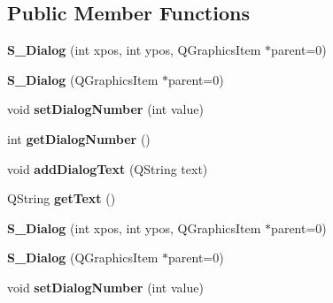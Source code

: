 \subsection*{Public Member Functions}
\begin{DoxyCompactItemize}
\item 
\hypertarget{class_s___dialog_a9b20a59ab0954ef8d9befdfbb556e398}{}{\bfseries S\+\_\+\+Dialog} (int xpos, int ypos, Q\+Graphics\+Item $\ast$parent=0)\label{class_s___dialog_a9b20a59ab0954ef8d9befdfbb556e398}

\item 
\hypertarget{class_s___dialog_a1694750fe7501bc3cd20eb97e1e3384f}{}{\bfseries S\+\_\+\+Dialog} (Q\+Graphics\+Item $\ast$parent=0)\label{class_s___dialog_a1694750fe7501bc3cd20eb97e1e3384f}

\item 
\hypertarget{class_s___dialog_a139b0eb3a98042192ac78df37806f1ad}{}void {\bfseries set\+Dialog\+Number} (int value)\label{class_s___dialog_a139b0eb3a98042192ac78df37806f1ad}

\item 
\hypertarget{class_s___dialog_ad26a628ae1d62d07e1b226126b04814f}{}int {\bfseries get\+Dialog\+Number} ()\label{class_s___dialog_ad26a628ae1d62d07e1b226126b04814f}

\item 
\hypertarget{class_s___dialog_ac156dc3bb16b5c84bce3c710dae215f7}{}void {\bfseries add\+Dialog\+Text} (Q\+String text)\label{class_s___dialog_ac156dc3bb16b5c84bce3c710dae215f7}

\item 
\hypertarget{class_s___dialog_aac6c0556054892ff474f485b962027fd}{}Q\+String {\bfseries get\+Text} ()\label{class_s___dialog_aac6c0556054892ff474f485b962027fd}

\item 
\hypertarget{class_s___dialog_a9b20a59ab0954ef8d9befdfbb556e398}{}{\bfseries S\+\_\+\+Dialog} (int xpos, int ypos, Q\+Graphics\+Item $\ast$parent=0)\label{class_s___dialog_a9b20a59ab0954ef8d9befdfbb556e398}

\item 
\hypertarget{class_s___dialog_a1694750fe7501bc3cd20eb97e1e3384f}{}{\bfseries S\+\_\+\+Dialog} (Q\+Graphics\+Item $\ast$parent=0)\label{class_s___dialog_a1694750fe7501bc3cd20eb97e1e3384f}

\item 
\hypertarget{class_s___dialog_a139b0eb3a98042192ac78df37806f1ad}{}void {\bfseries set\+Dialog\+Number} (int value)\label{class_s___dialog_a139b0eb3a98042192ac78df37806f1ad}


\end{DoxyCompactItemize}
